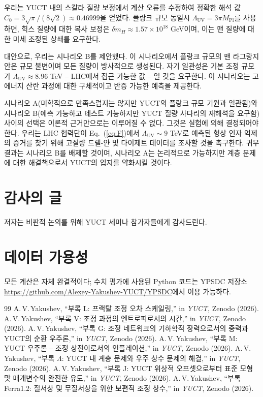 \documentclass[11pt,a4paper]{article}
\newcommand{\Mpl}{M_{\mathrm{Pl}}}
\newcommand{\LUV}{\Lambda_{\mathrm{UV}}}
\theoremstyle{remark}
\begin{document}
	우리는 YUCT 내의 스칼라 질량 보정에서 계산 오류를 수정하여 정확한 해석 값 \(C_0 = 3\sqrt{\pi}/(8\sqrt{2}) \approx 0.46999\)을 얻었다. 플랑크 규모 동일시 \(\LUV = 3\pi\Mpl\)를 사용하면, 힉스 질량에 대한 복사 보정은 \(\delta m_H \approx 1.57\times 10^{18}\) GeV이며, 이는 맨 질량에 대한 미세 조정된 상쇄를 요구한다.
	
	대안으로, 우리는 시나리오 B를 제안했다. 이 시나리오에서 플랑크 규모의 맨 라그랑지안은 규모 불변이며 모든 질량이 방사적으로 생성된다. 자기 일관성은 기본 조정 규모가 \(\LUV \approx 8.96\) TeV – LHC에서 접근 가능한 값 – 일 것을 요구한다. 이 시나리오는 고에너지 산란 과정에 대한 구체적이고 반증 가능한 예측을 제공한다.
	
	시나리오 A(미학적으로 만족스럽지는 않지만 YUCT의 플랑크 규모 기원과 일관됨)와 시나리오 B(예측 가능하고 테스트 가능하지만 YUCT 질량 사다리의 재해석을 요구함) 사이의 선택은 이론적 근거만으로는 이루어질 수 없다. 그것은 실험에 의해 결정되어야 한다. 우리는 LHC 협력단이 Eq.~(\ref{eq:F})에서 \(\LUV \sim 9\) TeV로 예측된 형상 인자 억제의 증거를 찾기 위해 고질량 드렐-얀 및 다이제트 데이터를 조사할 것을 촉구한다. 귀무 결과는 시나리오 B를 배제할 것이며, 시나리오 A는 논리적으로 가능하지만 계층 문제에 대한 해결책으로서 YUCT의 입지를 약화시킬 것이다.
	
	\section*{감사의 글}
	저자는 비판적 논의를 위해 YUCT 세미나 참가자들에게 감사드린다.
	
	\section*{데이터 가용성}
	모든 계산은 자체 완결적이다; 수치 평가에 사용된 Python 코드는 YPSDC 저장소 \url{https://github.com/Alexey-Yakushev-YUCT/YPSDC}에서 이용 가능하다.
	
	\begin{thebibliography}{99}
		 A.\,V.\,Yakushev, ``부록 L: 프랙탈 조정 오차 스케일링,'' in \emph{YUCT}, Zenodo (2026).
		 A.\,V.\,Yakushev, ``부록 V: 조정 과정의 엔트로피로서의 시간,'' in \emph{YUCT}, Zenodo (2026).
		 A.\,V.\,Yakushev, ``부록 G: 조정 네트워크의 기하학적 장력으로서의 중력과 YUCT의 순환 우주론,'' in \emph{YUCT}, Zenodo (2026).
		 A.\,V.\,Yakushev, ``부록 M: YUCT 우주론 – 조정 상전이로서의 인플레이션,'' in \emph{YUCT}, Zenodo (2026).
		 A.\,V.\,Yakushev, ``부록 \(\Lambda\): YUCT 내 계층 문제와 우주 상수 문제의 해결,'' in \emph{YUCT}, Zenodo (2026).
		 A.\,V.\,Yakushev, ``부록 J: YUCT 위상적 오프셋으로부터 표준 모형 맛 매개변수의 완전한 유도,'' in \emph{YUCT}, Zenodo (2026).
		 A.\,V.\,Yakushev, ``부록 Ferra1.2: 질서상 및 무질서상을 위한 보편적 조정 상수,'' in \emph{YUCT}, Zenodo (2026).
	\end{thebibliography}
	
\end{document}
